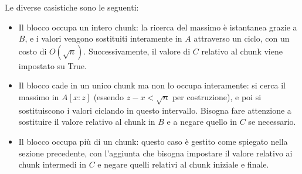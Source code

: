 \documentclass{article}
\begin{document}
Le diverse casistiche sono le seguenti:
\begin{itemize}
	\item Il blocco occupa un intero chunk: la ricerca del massimo è istantanea grazie a $B$, e i valori vengono sostituiti interamente in $A$ attraverso un ciclo, con un costo di $O(\sqrt{n})$. Successivamente, il valore di $C$ relativo al chunk viene impostato su True.
	
	\item Il blocco cade in un unico chunk ma non lo occupa interamente: si cerca il massimo in $A[x:z]$ (essendo $z - x < \sqrt{n}$ per costruzione), e poi si sostituiscono i valori ciclando in questo intervallo. Bisogna fare attenzione a sostituire il valore relativo al chunk in $B$ e a negare quello in $C$ se necessario.
	
	\item Il blocco occupa più di un chunk: questo caso è gestito come spiegato nella sezione precedente, con l'aggiunta che bisogna impostare il valore relativo ai chunk intermedi in $C$ e negare quelli relativi al chunk iniziale e finale.
\end{itemize}
\end{document}
